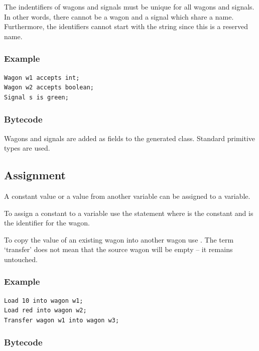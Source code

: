 The indentifiers of wagons and signals must be unique for all wagons and signals. In other words, there cannot be a wagon and a signal which share a name. Furthermore, the identifiers cannot start with the string  since this is a reserved name.

\subsubsection*{Example}

\begin{lstlisting}
Wagon w1 accepts int;
Wagon w2 accepts boolean;
Signal s is green;
\end{lstlisting}

\subsubsection*{Bytecode}

Wagons and signals are added as fields to the generated class. Standard primitive types are used.

\subsection{Assignment}

A constant value or a value from another variable can be assigned to a variable.

To assign a constant to a variable use the statement  where  is the constant and  is the identifier for the wagon.

To copy the value of an existing wagon into another wagon use . The term `transfer' does not mean that the source wagon will be empty -- it remains untouched.

\subsubsection*{Example}

\begin{lstlisting}
Load 10 into wagon w1;
Load red into wagon w2;
Transfer wagon w1 into wagon w3;
\end{lstlisting}

\subsubsection*{Bytecode}


